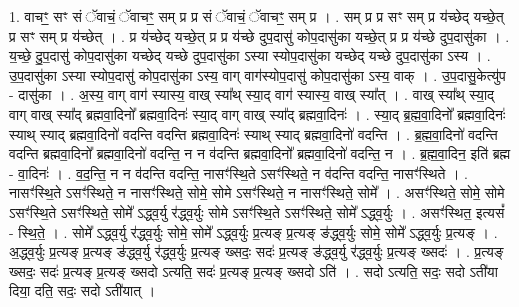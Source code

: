 \documentclass[17pt]{extarticle}
\begin{document}
1. वाचꣳ॒॒ सꣳ सं ॅवाचं॒ ॅवाचꣳ॒॒ सम् प्र प्र सं ॅवाचं॒ ॅवाचꣳ॒॒ सम् प्र । . सम् प्र प्र सꣳ सम् प्र य॑च्छेद् यच्छे॒त् प्र सꣳ सम् प्र य॑च्छेत् । . प्र य॑च्छेद् यच्छे॒त् प्र प्र य॑च्छे दुप॒दासु॑ कोप॒दासु॑का यच्छे॒त् प्र प्र य॑च्छे दुप॒दासु॑का । . य॒च्छे॒ दु॒प॒दासु॑ कोप॒दासु॑का यच्छेद् यच्छे दुप॒दासु॑का ऽस्या स्योप॒दासु॑का यच्छेद् यच्छे दुप॒दासु॑का ऽस्य । . उ॒प॒दासु॑का ऽस्या स्योप॒दासु॑ कोप॒दासु॑का ऽस्य॒ वाग् वाग॑स्योप॒दासु॑ कोप॒दासु॑का ऽस्य॒ वाक् । . उ॒प॒दासु॒केत्यु॑प - दासु॑का । . अ॒स्य॒ वाग् वाग॑ स्यास्य॒ वाख् स्या᳚थ् स्या॒द् वाग॑ स्यास्य॒ वाख् स्या᳚त् । . वाख् स्या᳚थ् स्या॒द् वाग् वाख् स्या᳚द् ब्रह्मवा॒दिनो᳚ ब्रह्मवा॒दिनः॑ स्या॒द् वाग् वाख् स्या᳚द् ब्रह्मवा॒दिनः॑ । . स्या॒द् ब्र॒ह्म॒वा॒दिनो᳚ ब्रह्मवा॒दिनः॑ स्याथ् स्याद् ब्रह्मवा॒दिनो॑ वदन्ति वदन्ति ब्रह्मवा॒दिनः॑ स्याथ् स्याद् ब्रह्मवा॒दिनो॑ वदन्ति । . ब्र॒ह्म॒वा॒दिनो॑ वदन्ति वदन्ति ब्रह्मवा॒दिनो᳚ ब्रह्मवा॒दिनो॑ वदन्ति॒ न न व॑दन्ति ब्रह्मवा॒दिनो᳚ ब्रह्मवा॒दिनो॑ वदन्ति॒ न । . ब्र॒ह्म॒वा॒दिन॒ इति॑ ब्रह्म - वा॒दिनः॑ । . व॒द॒न्ति॒ न न व॑दन्ति वदन्ति॒ नासꣳ॑स्थि॒ते ऽसꣳ॑स्थिते॒ न व॑दन्ति वदन्ति॒ नासꣳ॑स्थिते । . नासꣳ॑स्थि॒ते ऽसꣳ॑स्थिते॒ न नासꣳ॑स्थिते॒ सोमे॒ सोमे ऽसꣳ॑स्थिते॒ न नासꣳ॑स्थिते॒ सोमे᳚ । . असꣳ॑स्थिते॒ सोमे॒ सोमे ऽसꣳ॑स्थि॒ते ऽसꣳ॑स्थिते॒ सोमे᳚ ऽद्ध्व॒र्यु र॑द्ध्व॒र्युः सोमे ऽसꣳ॑स्थि॒ते ऽसꣳ॑स्थिते॒ सोमे᳚ ऽद्ध्व॒र्युः । . असꣳ॑स्थित॒ इत्यसं᳚ - स्थि॒ते॒ । . सोमे᳚ ऽद्ध्व॒र्यु र॑द्ध्व॒र्युः सोमे॒ सोमे᳚ ऽद्ध्व॒र्युः प्र॒त्यङ् प्र॒त्यङ् ङ॑द्ध्व॒र्युः सोमे॒ सोमे᳚ ऽद्ध्व॒र्युः प्र॒त्यङ् । . अ॒द्ध्व॒र्युः प्र॒त्यङ् प्र॒त्यङ् ङ॑द्ध्व॒र्यु र॑द्ध्व॒र्युः प्र॒त्यङ् ख्सदः॒ सदः॑ प्र॒त्यङ् ङ॑द्ध्व॒र्यु र॑द्ध्व॒र्युः प्र॒त्यङ् ख्सदः॑ । . प्र॒त्यङ् ख्सदः॒ सदः॑ प्र॒त्यङ् प्र॒त्यङ् ख्सदो ऽत्यति॒ सदः॑ प्र॒त्यङ् प्र॒त्यङ् ख्सदो ऽति॑ । . सदो ऽत्यति॒ सदः॒ सदो ऽती॑या दिया॒ दति॒ सदः॒ सदो ऽती॑यात् । \newline
\end{document}
